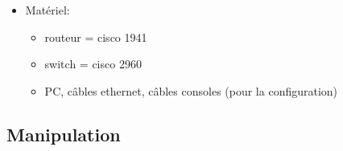 \documentclass[a4paper]{article}
\begin{document}
\begin{itemize}
\item Matériel:
\begin{itemize}
    \item routeur = cisco 1941
    \item switch = cisco 2960
    \item PC, câbles ethernet, câbles consoles (pour la configuration)
\end{itemize}





\end{itemize}










\subsection{Manipulation}
\end{document}
